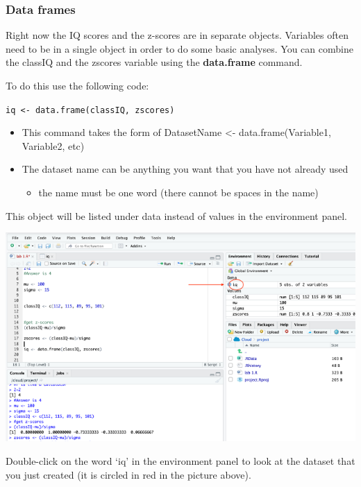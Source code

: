 \documentclass[
]{book}
\providecommand{\tightlist}{%
  \setlength{\itemsep}{0pt}\setlength{\parskip}{0pt}}
\begin{document}
\hypertarget{data-frames}{%
\subsubsection{Data frames}\label{data-frames}}

Right now the IQ scores and the z-scores are in separate objects. Variables often need to be in a single object in order to do some basic analyses. You can combine the classIQ and the zscores variable using the \textbf{data.frame} command.

To do this use the following code:

\texttt{iq\ \textless{}-\ data.frame(classIQ,\ zscores)}

\begin{itemize}
\tightlist
\item
  This command takes the form of DatasetName \textless- data.frame(Variable1, Variable2, etc)\\
\item
  The dataset name can be anything you want that you have not already used

  \begin{itemize}
  \tightlist
  \item
    the name must be one word (there cannot be spaces in the name)
  \end{itemize}
\end{itemize}

This object will be listed under data instead of values in the environment panel.

\includegraphics{img/dataframe.png}

Double-click on the word `iq' in the environment panel to look at the dataset that you just created (it is circled in red in the picture above).
\end{document}
